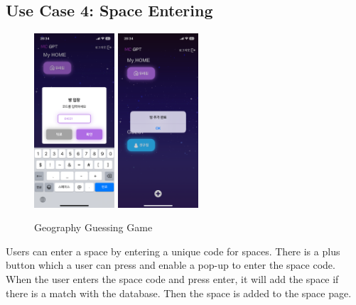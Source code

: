 \documentclass[conference]{IEEEtran}
\begin{document}
    \subsection{Use Case 4: Space Entering}
        \begin{figure}[htbp]
            \centerline{\includegraphics[width=3cm]{Images/screen/space/6_SPACE_POPUP2_FILLED.PNG}
            \includegraphics[width=3cm]{Images/screen/space/7_SPACE_ADD_ALERT.PNG}}
            \caption{Geography Guessing Game}
            \label{fig}
        \end{figure}
        Users can enter a space by entering a unique code for spaces. There is a plus button which a user can press and enable a pop-up to enter the space code. When the user enters the space code and press enter, it will add the space if there is a match with the database. Then the space is added to the space page.\\
\end{document}
